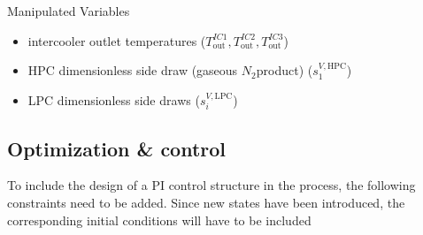     Manipulated Variables
    \begin{itemize}
        \item intercooler outlet temperatures ($T_{\text{out}}^{IC1}, T_{\text{out}}^{IC2}, T_{\text{out}}^{IC3}$)
        \item HPC dimensionless side draw (gaseous $N_2$product) ($s_1^{V, \text{HPC}}$)
        \item LPC dimensionless side draws ($s_i^{V, \text{LPC}}$)
    \end{itemize}

\subsection{Optimization \& control}
	To include the design of a PI control structure in the process, the following constraints need to be added.
	Since new states have been introduced, the corresponding initial conditions will have to be included
